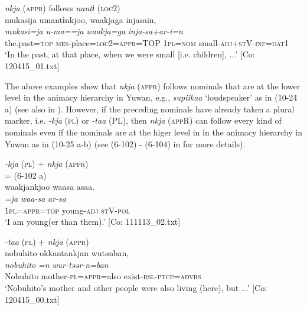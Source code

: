   \ex\textit{nkja} (\textsc{appr}) follows \textit{nantɨ} (\textsc{loc}2)\\
      \glll    mukasija  umantɨnkjoo,  waakjaga   injasain,\\
      \textit{mukasi=ja}  \textit{u-ma==ja}  \textit{waakja=ga}   \textit{inja-sa+ar-i=n}\\
      the.past=\textsc{top}  \textsc{mes}-place=\textsc{loc}2=\textsc{appr}=TOP  1\textsc{pl}=\textsc{nom}  small-\textsc{adj}+\textsc{st}V-\textsc{inf}=\textsc{dat}1\\
      \glt       ‘In the past, at that place, when we were small [i.e. children], ...’ [Co: 120415\_01.txt]
    \z
\z

The above examples show that \textit{nkja} (\textsc{appr}) follows nominals that are at the lower level in the animacy hierarchy in Yuwan, e.g., \textit{supiikaa} ‘loudspeaker’ as in (10-24 a) (see also  in ). However, if the preceding nominals have already taken a plural marker, i.e. \textit{{}-kja} (\textsc{pl}) or \textit{{}-taa} (PL), then \textit{nkja} (\textsc{app}R) can follow every kind of nominals even if the nominals are at the higer level in in the animacy hierarchy in Yuwan as in (10-25 a-b) (see (6-102) - (6-104) in  for more details).

\ea\label{ex:10.25}
\ea  \textit{{}-kja} (\textsc{pl}) + \textit{nkja} (\textsc{appr})\\ = (6-102 a)\\
      \glll    waakjankjoo  waasa  asaa.\\
    \textit{=ja}  \textit{waa-sa}  \textit{ar-sa}\\
    1\textsc{pl}=\textsc{appr}=\textsc{top}  young-\textsc{adj}  \textsc{st}V-\textsc{pol}\\
\glt     ‘I am young(er than them).’  [Co: 111113\_02.txt]

 \ex\textit{{}-taa} (\textsc{pl}) + \textit{nkja} (\textsc{appr})\\
      \glll    nobuhito  okkantankjan  wutənban,\\
    \textit{nobuhito}  \textit{=n}  \textit{wur-təər-n=ban}\\
    Nobuhito  mother-\textsc{pl}=\textsc{appr}=also  exist-\textsc{rsl}-\textsc{ptcp}=\textsc{advrs}\\
\glt     ‘Nobuhito’s mother and other people were also living (here), but ...’  [Co: 120415\_00.txt]
\z
\z

